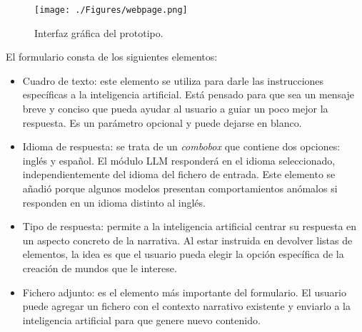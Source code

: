 \begin{figure}[htbp]
	\centering
	\texttt{[image: ./Figures/webpage.png]}
	\caption{Interfaz gráfica del prototipo.}
	\label{fig:webPage}
\end{figure}

El formulario consta de los siguientes elementos:
\begin{itemize}
\item Cuadro de texto:
este elemento se utiliza para darle las instrucciones específicas a la inteligencia artificial.
Está pensado para que sea un mensaje breve y conciso que pueda ayudar al usuario a guiar un poco mejor la respuesta.
Es un parámetro opcional y puede dejarse en blanco.
\item Idioma de respuesta:
se trata de un \textit{combobox} que contiene dos opciones: inglés y español.
El módulo LLM responderá en el idioma seleccionado, independientemente del idioma del fichero de entrada.
Este elemento se añadió porque algunos modelos presentan comportamientos anómalos si responden en un idioma distinto al inglés.
\item Tipo de respuesta:
permite a la inteligencia artificial centrar su respuesta en un aspecto concreto de la narrativa.
Al estar instruida en devolver listas de elementos, la idea es que el usuario pueda elegir la opción
específica de la creación de mundos que le interese.
\item Fichero adjunto:
es el elemento más importante del formulario.
El usuario puede agregar un fichero con el contexto narrativo existente
y enviarlo a la inteligencia artificial para que genere nuevo contenido.
\end{itemize}





